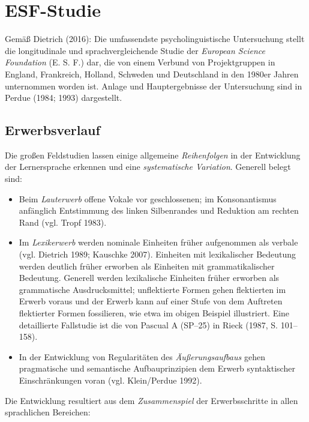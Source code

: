 \documentclass[
  letterpaper,
]{scrbook}
\providecommand{\tightlist}{%
  \setlength{\itemsep}{0pt}\setlength{\parskip}{0pt}}\usepackage{longtable,booktabs,array}
\begin{document}
\hypertarget{esf-studie}{%
\section{ESF-Studie}\label{esf-studie}}

Gemäß Dietrich (2016): Die umfassendste psycholinguistische Untersuchung
stellt die longitudinale und sprachvergleichende Studie der
\emph{European Science Foundation} (E. S. F.) dar, die von einem Verbund
von Projektgruppen in England, Frankreich, Holland, Schweden und
Deutschland in den 1980er Jahren unternommen worden ist. Anlage und
Hauptergebnisse der Untersuchung sind in Perdue (1984; 1993)
dargestellt.

\hypertarget{erwerbsverlauf}{%
\subsection{Erwerbsverlauf}\label{erwerbsverlauf}}

Die großen Feldstudien lassen einige allgemeine \emph{Reihenfolgen} in
der Entwicklung der Lernersprache erkennen und eine \emph{systematische
Variation}. Generell belegt sind:

\begin{itemize}
\tightlist
\item
  Beim \emph{Lauterwerb} offene Vokale vor geschlossenen; im
  Konsonantismus anfänglich Entstimmung des linken Silbenrandes und
  Reduktion am rechten Rand (vgl. Tropf 1983).\\
\item
  Im \emph{Lexikerwerb} werden nominale Einheiten früher aufgenommen als
  verbale (vgl. Dietrich 1989; Kauschke 2007). Einheiten mit
  lexikalischer Bedeutung werden deutlich früher erworben als Einheiten
  mit grammatikalischer Bedeutung. Generell werden lexikalische
  Einheiten früher erworben als grammatische Ausdrucksmittel;
  unflektierte Formen gehen flektierten im Erwerb voraus und der Erwerb
  kann auf einer Stufe von dem Auftreten flektierter Formen fossilieren,
  wie etwa im obigen Beispiel illustriert. Eine detaillierte Fallstudie
  ist die von Pascual A (SP--25) in Rieck (1987, S. 101--158).\\
\item
  In der Entwicklung von Regularitäten des \emph{Äußerungsaufbaus} gehen
  pragmatische und semantische Aufbauprinzipien dem Erwerb syntaktischer
  Einschränkungen voran (vgl. Klein/Perdue 1992).
\end{itemize}

Die Entwicklung resultiert aus dem \emph{Zusammenspiel} der
Erwerbsschritte in allen sprachlichen Bereichen:
\end{document}
